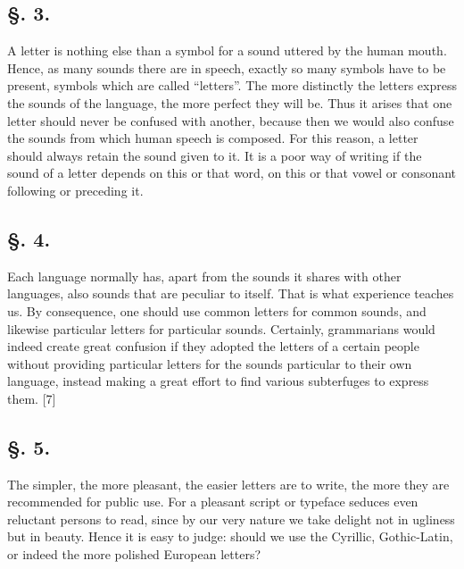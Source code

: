 \subsection*{\hspace*{\fill}§. 3.\hspace*{\fill}}

A letter is nothing else than a symbol for a sound uttered by the human mouth. Hence, as many sounds there are in speech, exactly so many symbols have to be present, symbols which are called “letters”. The more distinctly the letters express the sounds of the language, the more perfect they will be. Thus it arises that one letter should never be confused with another, because then we would also confuse the sounds from which human speech is composed. For this reason, a letter should always retain the sound given to it. It is a poor way of writing if the sound of a letter depends on this or that word, on this or that vowel or consonant following or preceding it.

\subsection*{\hspace*{\fill}§. 4.\hspace*{\fill}}

Each language normally has, apart from the sounds it shares with other languages, also sounds that are peculiar to itself. That is what experience teaches us. By consequence, one should use common letters for common sounds, and likewise particular letters for particular sounds. Certainly, grammarians would indeed create great confusion if they adopted the letters of a certain people without providing particular letters for the sounds particular to their own language, instead making a great effort to find various subterfuges to express them. [7]

\subsection*{\hspace*{\fill}§. 5.\hspace*{\fill}}

The simpler, the more pleasant, the easier letters are to write, the more they are recommended for public use. For a pleasant script or typeface seduces even reluctant persons to read, since by our very nature we take delight not in ugliness but in beauty. Hence it is easy to judge: should we use the Cyrillic, Gothic-Latin, or indeed the more polished European letters?

